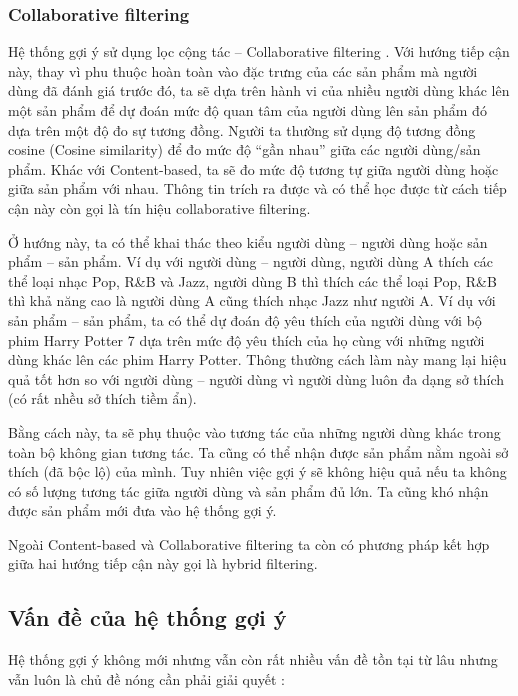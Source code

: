 \subsubsection{Collaborative filtering}
\noindent Hệ thống gợi ý sử dụng lọc cộng tác -- Collaborative filtering \cite{survey:CF-tech}. Với hướng tiếp cận này, thay vì phu thuộc hoàn toàn vào đặc trưng của các sản phẩm mà người dùng đã đánh giá trước đó, ta sẽ dựa trên hành vi của nhiều người dùng khác lên một sản phẩm để dự đoán mức độ quan tâm của người dùng lên sản phẩm đó dựa trên một độ đo sự tương đồng. Người ta thường sử dụng độ tương đồng cosine (Cosine similarity) để đo mức độ ``gần nhau'' giữa các người dùng/sản phẩm. Khác với Content-based, ta sẽ đo mức độ tương tự giữa người dùng hoặc giữa sản phẩm với nhau. Thông tin trích ra được và có thể học được từ cách tiếp cận này còn gọi là tín hiệu collaborative filtering.

Ở hướng này, ta có thể khai thác theo kiểu người dùng -- người dùng hoặc sản phẩm -- sản phẩm. Ví dụ với người dùng -- người dùng, người dùng A thích các thể loại nhạc Pop, R\&B và Jazz, người dùng B thì thích các thể loại Pop, R\&B thì khả năng cao là người dùng A cũng thích nhạc Jazz như người A. Ví dụ với sản phẩm -- sản phẩm, ta có thể dự đoán độ yêu thích của người dùng với bộ phim Harry Potter 7 dựa trên mức độ yêu thích của họ cùng với những người dùng khác lên các phim Harry Potter. Thông thường cách làm này mang lại hiệu quả tốt hơn so với người dùng -- người dùng vì người dùng luôn đa dạng sở thích (có rất nhều sở thích tiềm ẩn).

Bằng cách này, ta sẽ phụ thuộc vào tương tác của những người dùng khác trong toàn bộ không gian tương tác. Ta cũng có thể nhận được sản phẩm nằm ngoài sở thích (đã bộc lộ) của mình. Tuy nhiên việc gợi ý sẽ không hiệu quả nếu ta không có số lượng tương tác giữa người dùng và sản phẩm đủ lớn. Ta cũng khó nhận được sản phẩm mới đưa vào hệ thống gợi ý.

Ngoài Content-based và Collaborative filtering ta còn có phương pháp kết hợp giữa hai hướng tiếp cận này gọi là hybrid filtering. 

\subsection{Vấn đề của hệ thống gợi ý} \label{2.1.3-rec-issues}

\noindent Hệ thống gợi ý không mới nhưng vẫn còn rất nhiều vấn đề tồn tại từ lâu nhưng vẫn luôn là chủ đề nóng cần phải giải quyết \cite{survey:rec-sys-tech&issues}:


